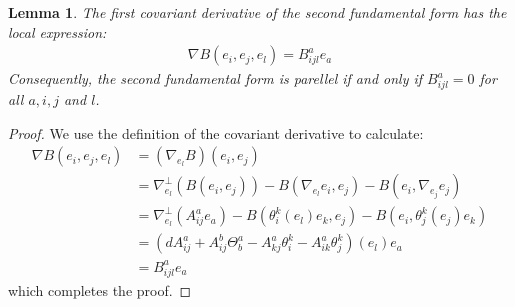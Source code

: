 \documentclass[11pt]{amsart}
\newtheorem{lem}[subsection]{Lemma}
\theoremstyle{definition}
\begin{document}
\begin{lem}  The first covariant derivative of the second fundamental form has the local expression:
%
\begin{align*}
\nabla B (e_i, e_j, e_l) = B^a_{ijl} e_a
\end{align*}
%
Consequently, the second fundamental form is parellel if and only if $B^a_{ijl} = 0$ for all $a,i,j$ and $l$.
%
\end{lem}

\begin{proof}  We use the definition of the covariant derivative to calculate:
%
\begin{align*}
\nabla B (e_i, e_j, e_l) &= ( \nabla_{e_l} B )(e_i, e_j) \\
&= \nabla^{\perp}_{e_l} \left( B( e_i, e_j) \right) - B( \nabla_{e_l} e_i, e_j ) - B( e_i, \nabla_{e_j} e_j ) \\
&= \nabla^{\perp}_{e_l} \left( A^a_{ij} e_a \right) - B( \theta^k_i (e_l) e_k, e_j ) - B( e_i, \theta^k_j (e_j) e_k ) \\
&= \left( d A^a_{ij} + A^b_{ij} \Theta^a_b - A^a_{kj} \theta^k_i - A^a_{ik} \theta^k_j \right)(e_l) e_a \\
&= B^a_{ijl} e_a
\end{align*}
%
which completes the proof.
%
\end{proof}
\end{document}
